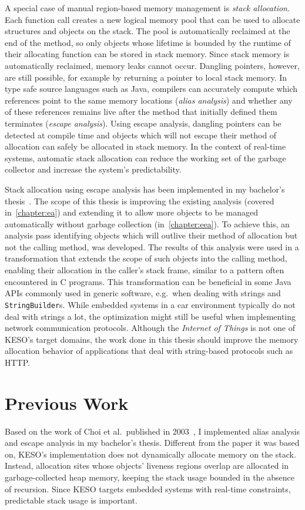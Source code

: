 		A special case of manual region-based memory management is \emph{stack allocation}. Each function call creates a new
		logical memory pool that can be used to allocate structures and objects on the stack. The pool is automatically
		reclaimed at the end of the method, so only objects whose lifetime is bounded by the runtime of their allocating
		function can be stored in stack memory. Since stack memory is automatically reclaimed, memory leaks cannot occur.
		Dangling pointers, however, are still possible, for example by returning a pointer to local stack memory. In type
		safe source languages such as Java, compilers can accurately compute which references point to the same memory
		locations (\emph{alias analysis}) and whether any of these references remains live after the method that initially
		defined them terminates (\emph{escape analysis}). Using escape analysis, dangling pointers can be detected at
		compile time and objects which will not escape their method of allocation can safely be allocated in stack memory.
		In the context of real-time systems, automatic stack allocation can reduce the working set of the garbage collector
		and increase the system's predictability.

		Stack allocation using escape analysis has been implemented in my bachelor's thesis~\cite{lang:12}. The scope of
		this thesis is improving the existing analysis (covered in~\cref{chapter:ea}) and extending it to allow more objects
		to be managed automatically without garbage collection (in~\cref{chapter:eea}). To achieve this, an analysis pass
		identifying objects which will outlive their method of allocation but not the calling method, was developed. The
		results of this analysis were used in a transformation that extends the scope of such objects into the calling
		method, enabling their allocation in the caller's stack frame, similar to a pattern often encountered in C programs.
		This transformation can be beneficial in some Java APIs commonly used in generic software, e.g.\ when dealing with
		strings and \texttt{StringBuilder}s. While embedded systems in a car environment typically do not deal with strings
		a lot, the optimization might still be useful when implementing network communication protocols. Although the
		\emph{Internet of Things} is not one of KESO's target domains, the work done in this thesis should improve the
		memory allocation behavior of applications that deal with string-based protocols such as HTTP.

	\section{Previous Work}
		\label{sec:intro:prev}
		Based on the work of Choi et al.\ published in 2003~\cite{choi:03}, I implemented alias analysis and escape analysis
		in my bachelor's thesis. Different from the paper it was based on, KESO's implementation does not dynamically
		allocate memory on the stack. Instead, allocation sites whose objects' liveness regions overlap are allocated in
		garbage-collected heap memory, keeping the stack usage bounded in the absence of recursion. Since KESO targets
		embedded systems with real-time constraints, predictable stack usage is important.

